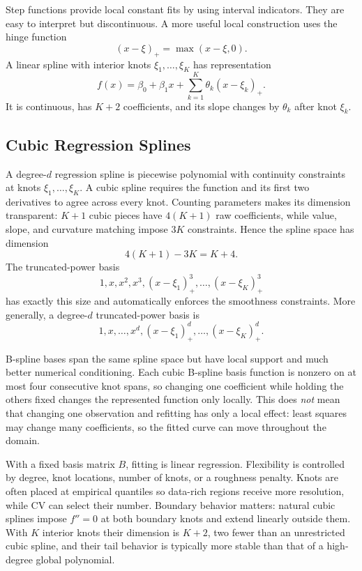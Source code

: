 \documentclass[12pt,oneside]{book}
\numberwithin{equation}{section}
\theoremstyle{definition}
\theoremstyle{plain}
\theoremstyle{remark}
\begin{document}
Step functions provide local constant fits by using interval indicators.
They are easy to interpret but discontinuous. A more useful local construction
uses the hinge function
\[
 (x-\xi)_+=\max(x-\xi,0).
\]
A linear spline with interior knots $\xi_1,\ldots,\xi_K$ has representation
\begin{equation}
 f(x)=\beta_0+\beta_1x+\sum_{k=1}^K\theta_k(x-\xi_k)_+.
 \label{eq:linear-spline-hinge}
\end{equation}
It is continuous, has $K+2$ coefficients, and its slope changes by $\theta_k$
after knot $\xi_k$.

\subsection{Cubic Regression Splines}

A degree-$d$ regression spline is piecewise polynomial with continuity
constraints at knots $\xi_1,\ldots,\xi_K$. A cubic spline requires the
function and its first two derivatives to agree across every knot. Counting
parameters makes its dimension transparent: $K+1$ cubic pieces have
$4(K+1)$ raw coefficients, while value, slope, and curvature matching impose
$3K$ constraints. Hence the spline space has dimension
\[
 4(K+1)-3K=K+4.
\]
The truncated-power basis
\[
 1,x,x^2,x^3,(x-\xi_1)_+^3,\ldots,(x-\xi_K)_+^3
\]
has exactly this size and automatically enforces the smoothness constraints.
More generally, a degree-$d$ truncated-power basis is
\[
 1,x,\ldots,x^d,(x-\xi_1)_+^d,\ldots,(x-\xi_K)_+^d.
\]

B-spline bases span the same spline space but have local support and much
better numerical conditioning. Each cubic B-spline basis function is nonzero
on at most four consecutive knot spans, so changing one coefficient while
holding the others fixed changes the represented function only locally.
This does \emph{not} mean that changing one observation and refitting has only
a local effect: least squares may change many coefficients, so the fitted
curve can move throughout the domain.

With a fixed basis matrix $B$, fitting is linear regression. Flexibility is
controlled by degree, knot locations, number of knots, or a roughness penalty.
Knots are often placed at empirical quantiles so data-rich regions receive
more resolution, while CV can select their number. Boundary behavior matters:
natural cubic splines impose $f''=0$ at both boundary knots and extend linearly
outside them. With $K$ interior knots their dimension is $K+2$, two fewer than
an unrestricted cubic spline, and their tail behavior is typically more stable
than that of a high-degree global polynomial.
\end{document}
